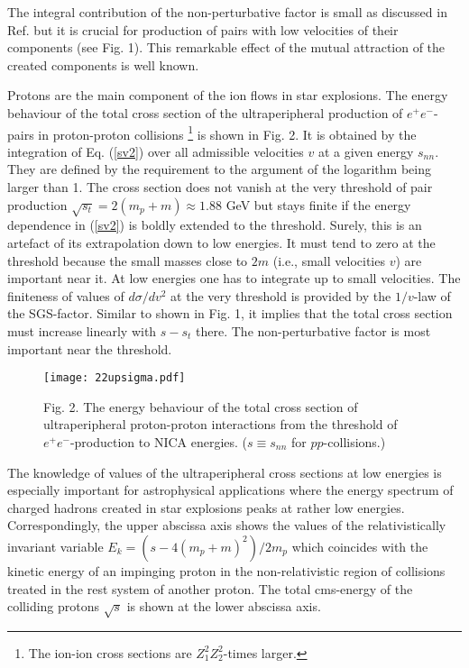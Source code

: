 \documentclass[12pt]{article}
\begin{document}
The integral contribution of the non-perturbative factor is small 
as discussed in Ref. \cite{dgm} but it is crucial for production of pairs 
with low velocities of their components (see Fig. 1). 
This remarkable effect of the mutual attraction of the created components 
is well known.

Protons are the main component of the ion flows in star explosions.
The energy behaviour of the total cross section of the ultraperipheral 
production of $e^+e^-$-pairs in proton-proton collisions \footnote{The ion-ion 
cross sections are $Z^2_1Z^2_2$-times larger.} is shown in Fig. 2.
It is obtained by the integration of Eq. (\ref{sv2}) over all admissible 
velocities $v$ at a given energy $s_{nn}$. They are defined by the requirement 
to the argument of the logarithm being larger than 1. The cross section does 
not vanish at the very threshold of pair production 
$\sqrt {s_t}=2(m_p+m)\approx 1.88$ GeV but stays finite if the energy 
dependence in (\ref{sv2}) is boldly extended to the threshold. Surely, this 
is an artefact of its extrapolation down to low energies. It must tend to zero 
at the threshold because the small masses close to $2m$ (i.e., small 
velocities $v$) are important near it. At low energies one has to integrate up 
to small velocities. The finiteness of values of $d\sigma /dv^2$ at the very 
threshold is provided by the $1/v$-law of the SGS-factor. Similar to shown 
in Fig. 1, it implies that the total cross section must increase 
linearly with $s-s_t$ there. The non-perturbative factor is most important 
near the threshold.

\begin{figure}

\centerline{\texttt{[image: 22upsigma.pdf]}}

Fig. 2. The energy behaviour of the total cross section of ultraperipheral
proton-proton interactions from the threshold of $e^+e^-$-production 
to NICA energies. ($s\equiv s_{nn}$ for $pp$-collisions.)
\end{figure}

The knowledge of values of the ultraperipheral cross sections at low energies 
is especially important for astrophysical applications where the energy 
spectrum of charged hadrons created in star explosions peaks at rather 
low energies. Correspondingly, the upper abscissa axis shows the values
of the relativistically invariant variable $E_k=(s-4(m_p+m)^2)/2m_p$
which coincides with the kinetic energy of an impinging proton in the 
non-relativistic region of collisions treated in the rest system of another 
proton. The total cms-energy of the colliding protons $\sqrt s$ is shown at the
lower abscissa axis.
\end{document}
